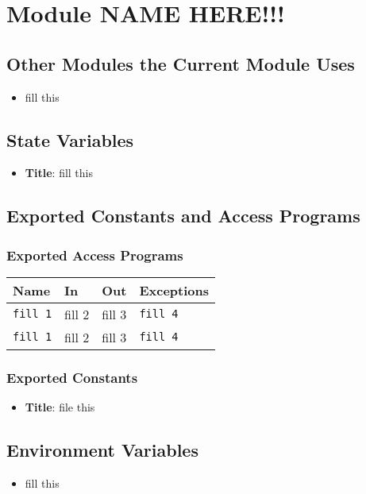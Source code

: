\documentclass[12pt, titlepage]{article}
\begin{document}
\section{Module NAME HERE!!!}

\subsection{Other Modules the Current Module Uses}
\begin{itemize}
    \item fill this 
\end{itemize}

\subsection{State Variables}
\begin{itemize}
    \item \textbf{Title}: fill this 
\end{itemize}

\subsection{Exported Constants and Access Programs}
\subsubsection{Exported Access Programs}
\begin{tabular}{|l|l|l|l|}
    \hline
    \textbf{Name} & \textbf{In} & \textbf{Out} & \textbf{Exceptions} \\
    \hline 
    \texttt{fill 1} & fill 2 & fill 3 & \texttt{fill 4} \\
    \hline
    \texttt{fill 1} & fill 2 & fill 3 & \texttt{fill 4} \\
    \hline
\end{tabular}

\subsubsection{Exported Constants}
\begin{itemize}
\item \textbf{Title}: file this 
\end{itemize}

\subsection{Environment Variables}
\begin{itemize}
    \item fill this
\end{itemize}
\end{document}
